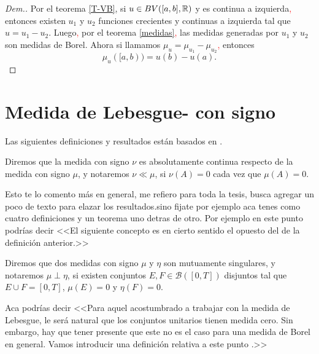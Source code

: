 \begin{proof}[Dem.]
Por el teorema \ref{T-VB}, si $u\in BV([a,b],\mathbb{R})$ y es continua a izquierda\textcolor{red}{,} entonces existen $u_1$ y $u_2$ funciones crecientes y continuas a izquierda tal que $u=u_1-u_2$. Luego\textcolor{red}{,} por el teorema \ref{medidas}\textcolor{red}{,}  las medidas generadas por $u_1$ y $u_2$ son medidas de Borel. Ahora si llamamos  $\mu_u=\mu_{u_1}-\mu_{u_2}$\textcolor{red}{,}   entonces
$$\mu_{u}([a,b))=u(b)-u(a).$$
\end{proof}


\section{Medida de Lebesgue- con signo}

Las siguientes definiciones y resultados están basados en \cite[Capitulo 3]{folland}.

\begin{defi}
	Diremos que la medida con signo $\nu$ es absolutamente continua  respecto de la medida con signo $\mu$, y  notaremos $\nu\ll\mu$\index[Simbolo]{$\ll$}, si $\nu(A)=0$ cada vez que  $\mu(A)=0$. 
\end{defi}


{\color{green}
 Esto te lo comento más en general, me refiero para toda la tesis, busca agregar un poco de texto para elazar los resultados.sino fijate por ejemplo aca tenes como cuatro definiciones y un teorema uno detras de otro. Por ejemplo en este punto podrías decir <<El siguiente concepto es en cierto sentido el opuesto del de la definición anterior.>> 
}

\begin{defi}
	Diremos que dos medidas con signo $\mu$ y $\eta$ son mutuamente singulares, y  notaremos $\mu\perp \eta$,  si existen conjuntos $E,F\in\mathscr{B}([0,T])$ disjuntos tal que $E\cup F=[0,T]$, $\mu(E)=0$ y $\eta(F)=0$. \index[Simbolo]{$\perp$}\normalmarginpar{}
\end{defi}

{\color{green} Aca podrías decir <<Para aquel acostumbrado a trabajar con la medida de Lebesgue, le será natural que los conjuntos unitarios tienen medida cero. Sin embargo, hay que tener presente que este no es el caso para una medida de Borel en general. Vamos introducir una definición relativa a este punto  .>>}

